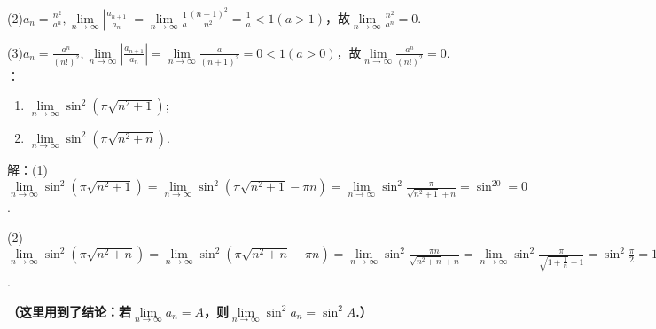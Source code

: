 \documentclass[12pt,UTF8]{ctexart}
\begin{document}
\begin{enumerate}
(2)$a_n=\frac{n^2}{a^n},\lim\limits_{n\rightarrow\infty}|\frac{a_{n+1}}{a_n}|=\lim\limits_{n\rightarrow\infty}\frac1a\frac{(n+1)^2}{n^2}=\frac1a<1(a>1)$，故$\lim\limits_{n\rightarrow\infty}\frac{n^2}{a^n}=0$.

(3)$a_n=\frac{a^n}{(n!)^2},\lim\limits_{n\rightarrow\infty}|\frac{a_{n+1}}{a_n}|=\lim\limits_{n\rightarrow\infty}\frac a{(n+1)^2}=0<1(a>0)$，故$\lim\limits_{n\rightarrow\infty}\frac{a^n}{(n!)^2}=0$.
：
\begin{enumerate}[(1)]
	\item$\lim\limits_{n\rightarrow\infty}\sin^2(\pi\sqrt{n^2+1})$;
	\item$\lim\limits_{n\rightarrow\infty}\sin^2(\pi\sqrt{n^2+n})$.
\end{enumerate}
解：(1)$\lim\limits_{n\rightarrow\infty}\sin^2(\pi\sqrt{n^2+1})=\lim\limits_{n\rightarrow\infty}\sin^2(\pi\sqrt{n^2+1}-\pi n)=\lim\limits_{n\rightarrow\infty}\sin^2\frac{\pi}{\sqrt{n^2+1}+n}=\sin^20=0$.

(2)$\lim\limits_{n\rightarrow\infty}\sin^2(\pi\sqrt{n^2+n})=\lim\limits_{n\rightarrow\infty}\sin^2(\pi\sqrt{n^2+n}-\pi n)=\lim\limits_{n\rightarrow\infty}\sin^2\frac{\pi n}{\sqrt{n^2+n}+n}=\lim\limits_{n\rightarrow\infty}\sin^2\frac{\pi}{\sqrt{1+\frac1n}+1}=\sin^2\frac\pi2=1$.


{\bf（这里用到了结论：若$\lim\limits_{n\rightarrow\infty}a_n=A$，则$\lim\limits_{n\rightarrow\infty}\sin^2a_n=\sin^2A$.）}
\end{enumerate}
\end{document}
